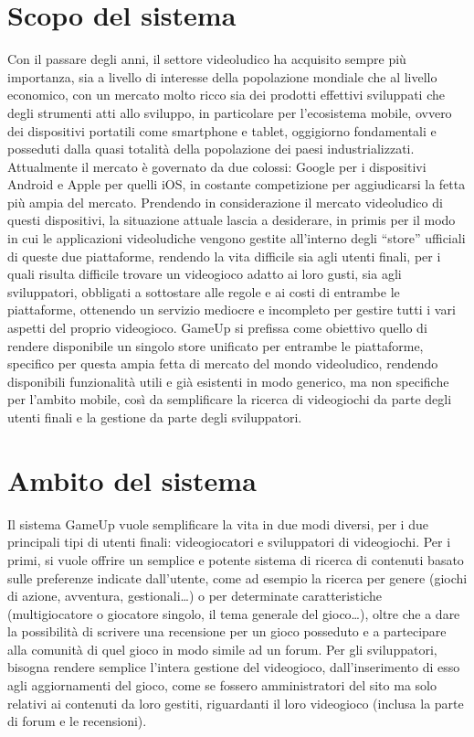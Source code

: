 \section{Scopo del sistema}
Con il passare degli anni, il settore videoludico ha acquisito sempre più importanza, sia a livello di interesse della popolazione mondiale che al livello economico, con un mercato molto ricco sia dei prodotti effettivi sviluppati che degli strumenti atti allo sviluppo, in particolare per l’ecosistema mobile, ovvero dei dispositivi portatili come smartphone e tablet, oggigiorno fondamentali e posseduti dalla quasi totalità della popolazione dei paesi industrializzati. Attualmente il mercato è governato da due colossi: Google per i dispositivi Android e Apple per quelli iOS, in costante competizione per aggiudicarsi la fetta più ampia del mercato. Prendendo in considerazione il mercato videoludico di questi dispositivi, la situazione attuale lascia a desiderare, in primis per il modo in cui le applicazioni videoludiche vengono gestite all’interno degli “store” ufficiali di queste due piattaforme, rendendo la vita difficile sia agli utenti finali, per i quali risulta difficile trovare un videogioco adatto ai loro gusti, sia agli sviluppatori, obbligati a sottostare alle regole e ai costi di entrambe le piattaforme, ottenendo un servizio mediocre e incompleto per gestire tutti i vari aspetti del proprio videogioco. GameUp si prefissa come obiettivo quello di rendere disponibile un singolo store unificato per entrambe le piattaforme, specifico per questa ampia fetta di mercato del mondo videoludico, rendendo disponibili funzionalità utili e già esistenti in modo generico, ma non specifiche per l’ambito mobile, così da semplificare la ricerca di videogiochi da parte degli utenti finali e la gestione da parte degli sviluppatori.

\section{Ambito del sistema}
Il sistema GameUp vuole semplificare la vita in due modi diversi, per i due principali tipi di utenti finali: videogiocatori e sviluppatori di videogiochi. Per i primi, si vuole offrire un semplice e potente sistema di ricerca di contenuti basato sulle preferenze indicate dall’utente, come ad esempio la ricerca per genere (giochi di azione, avventura, gestionali…) o per determinate caratteristiche (multigiocatore o giocatore singolo, il tema generale del gioco…), oltre che a dare la possibilità di scrivere una recensione per un gioco posseduto e a partecipare alla comunità di quel gioco in modo simile ad un forum. Per gli sviluppatori, bisogna rendere semplice l’intera gestione del videogioco, dall’inserimento di esso agli aggiornamenti del gioco, come se fossero amministratori del sito ma solo relativi ai contenuti da loro gestiti, riguardanti il loro videogioco (inclusa la parte di forum e le recensioni).

